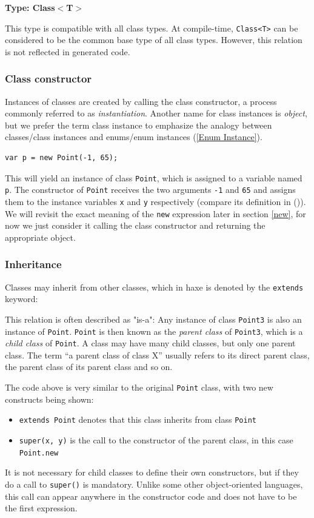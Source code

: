 \documentclass{article}
\newcommand{\type}[1]{\texttt{#1}}
\newcommand{\expr}[1]{\texttt{#1}}
\newenvironment{myshaded}
  {\def\FrameCommand{\fboxsep=\topsep\colorbox{bgcolor}}%
  \MakeFramed {\advance\hsize-\width \FrameRestore}}%
 {\endMakeFramed}
\newcommand{\define}[3][Definition]
	{\begin{myshaded}\noindent\textbf{#1: #2}\par\nobreak\noindent\ignorespaces#3\label{def:#2}\end{myshaded}}
\newcommand{\Fullref}[1]{\nameref{#1} (\Cref{#1})}
\newcommand{\tref}[2]{#1 (\ref{#2})}
\begin{document}
\define[Type]{Class$<$T$>$}{This type is compatible with all class types. At compile-time, \type{Class<T>} can be considered to be the common base type of all class types. However, this relation is not reflected in generated code.}



\subsubsection{Class constructor}
\label{Class Constructor}

Instances of classes are created by calling the class constructor, a process commonly referred to as \emph{instantiation}. Another name for class instances is \emph{object}, but we prefer the term class instance to emphasize the analogy between classes/class instances and \tref{enums/enum instances}{Enum Instance}. 

\begin{lstlisting}
var p = new Point(-1, 65);
\end{lstlisting}
This will yield an instance of class \type{Point}, which is assigned to a variable named \expr{p}. The constructor of \type{Point} receives the two arguments \expr{-1} and \expr{65} and assigns them to the instance variables \expr{x} and \expr{y} respectively (compare its definition in \Fullref{Class Instance}). We will revisit the exact meaning of the \expr{new} expression later in section \ref{new}, for now we just consider it calling the class constructor and returning the appropriate object.



\subsubsection{Inheritance}
\label{Inheritance}

Classes may inherit from other classes, which in haxe is denoted by the \expr{extends} keyword:


This relation is often described as "is-a": Any instance of class \type{Point3} is also an instance of \type{Point}. \type{Point} is then known as the \emph{parent class} of \type{Point3}, which is a \emph{child class} of \type{Point}. A class may have many child classes, but only one parent class. The term ``a parent class of class X'' usually refers to its direct parent class, the parent class of its parent class and so on.

The code above is very similar to the original \type{Point} class, with two new constructs being shown:
\begin{itemize}
 \item \expr{extends Point} denotes that this class inherits from class \type{Point}
 \item \expr{super(x, y)} is the call to the constructor of the parent class, in this case \expr{Point.new}
\end{itemize}
It is not necessary for child classes to define their own constructors, but if they do a call to \expr{super()} is mandatory. Unlike some other object-oriented languages, this call can appear anywhere in the constructor code and does not have to be the first expression.
\end{document}

